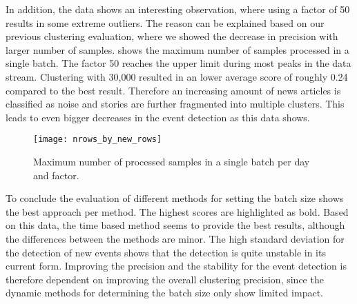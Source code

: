 In addition, the data shows an interesting observation, where using a factor of 50 results in some extreme outliers.
The reason can be explained based on our previous clustering evaluation,
where we showed the decrease in precision with larger number of samples.
 shows the maximum number of samples processed in a single batch.
The factor 50 reaches the upper limit during most peaks in the data stream.
Clustering with 30,000 resulted in an lower average score of roughly 0.24 compared to the best result.
Therefore an increasing amount of news articles is classified as noise and stories
are further fragmented into multiple clusters.
This leads to even bigger decreases in the event detection as this data shows.

\begin{figure}[h]
    \centering
    \texttt{[image: nrows\_by\_new\_rows]}
    \caption{Maximum number of processed samples in a single batch per day and factor.}
    \label{fig:nrows_by_new_rows}
 \end{figure}

To conclude the evaluation of different methods for setting the batch size 
shows the best approach per method.
The highest scores are highlighted as bold.
Based on this data, the time based method seems to provide the best results,
although the differences between the methods are minor.
The high standard deviation for the detection of new events shows
that the detection is quite unstable in its current form.
Improving the precision and the stability for the event detection
is therefore dependent on improving the overall clustering precision,
since the dynamic methods for determining the batch size only show limited impact.

\begin{table}[h]
    \centering
    \caption{Final scores obtained by each method for setting the batch size.}
    \label{tab:batch_size_methods}
\end{table}

